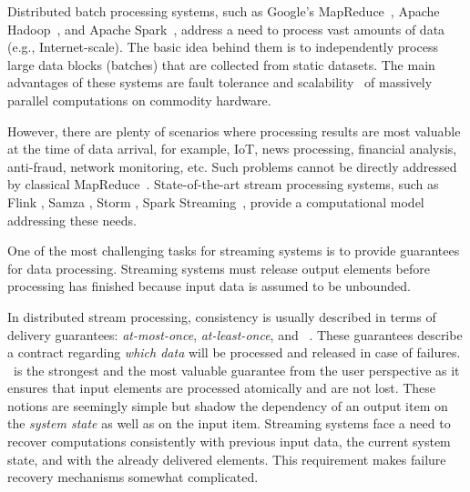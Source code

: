
\label {fs-intro-seciton}

Distributed batch processing systems, such as Google's MapReduce~\cite{Dean:2008:MSD:1327452.1327492}, Apache Hadoop~\cite{hadoop2009hadoop}, and Apache Spark~\cite{Zaharia:2016:ASU:3013530.2934664}, address a need to process vast amounts of data (e.g., Internet-scale). 
The basic idea behind them is to independently process large data blocks (batches) that are collected from static datasets. 
The main advantages of these systems are fault tolerance and scalability~\cite{borthakur2011apache} of massively parallel computations on commodity hardware.

However, there are plenty of scenarios where processing results are most valuable at the time of data arrival, for example, IoT, news processing, financial analysis, anti-fraud, network monitoring, etc. 
Such problems cannot be directly addressed by classical MapReduce~\cite{Doulkeridis:2014:SLA:2628707.2628782}. 
State-of-the-art stream processing systems, such as Flink \cite{carbone2015apache}, Samza \cite{Noghabi:2017:SSS:3137765.3137770}, Storm \cite{apache:storm}, Spark Streaming~\cite{Zaharia:2012:DSE:2342763.2342773},   provide a computational model addressing these needs.

One of the most challenging tasks for streaming systems is to provide guarantees for data processing. 
Streaming systems must release output elements before processing has finished because input data is assumed to be unbounded. 

In distributed stream processing, consistency is usually described in terms of delivery guarantees: {\em at-most-once}, {\em at-least-once}, and {\em \eo}~\cite{carbone2015apache}. 
These guarantees describe a contract regarding {\em which data} will be processed and released in case of failures. 
\Eo\ is the strongest and the most valuable guarantee from the user perspective as it ensures that input elements are processed atomically and are not lost. These notions are seemingly simple but shadow the dependency of an output item on the {\em system state} as well as on the input item. 
Streaming systems face a need to recover computations consistently with previous input data, the current system state, and with the already delivered elements.
This requirement makes failure recovery mechanisms somewhat complicated. 

